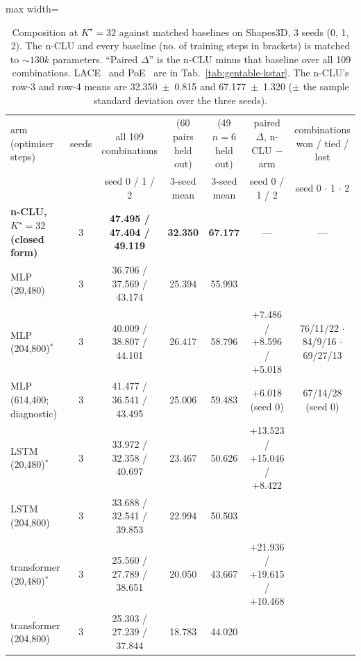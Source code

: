 \documentclass{article} %
\newcommand{\Kstar}{\ensuremath{K^{\star}}}
\begin{document}
\begin{table}[htb]
\centering\small
\caption{Composition at $\Kstar=32$ against matched baselines on Shapes3D, $3$
seeds (0, 1, 2). The n-CLU %
and every baseline (no. of training steps in brackets) is matched to $\sim130k$ parameters.  ``Paired $\Delta$'' is the n-CLU minus
that baseline over all 109 combinations. LACE~\citep{nie_controllable_2021} and PoE~\citep{hinton_training_2002} are in %
Tab.~\ref{tab:gentable-kstar}. The n-CLU's row-3 and row-4 means are 32.350~$\pm$~0.815 and 67.177~$\pm$~1.320 %
($\pm$ the sample standard deviation over the three seeds).}
\label{tab:t7}
\setlength{\tabcolsep}{3pt}
\begin{adjustbox}{max width=\linewidth}\begin{tabular}{lcccccc}
\toprule
arm (optimiser steps) & seeds & all 109 combinations & (60 pairs held out) & (49 $n=6$ held out) & paired $\Delta$, n-CLU $-$ arm & combinations won / tied / lost \\ %
 & & seed 0 / 1 / 2 & 3-seed mean & 3-seed mean & seed 0 / 1 / 2 & seed 0 $\cdot$ 1 $\cdot$ 2 \\
\midrule
\textbf{n-CLU, $\Kstar=32$ (closed form)} & 3 & \textbf{47.495 / 47.404 / 49.119} & \textbf{32.350} & \textbf{67.177} & --- & --- \\
MLP (20,480) & 3 & 36.706 / 37.569 / 43.174 & 25.394 & 55.993 & & \\
MLP (204,800)$^\ast$ & 3 & 40.009 / 38.807 / 44.101 & 26.417 & 58.796 & +7.486 / +8.596 / +5.018 & 76/11/22 $\cdot$ 84/9/16 $\cdot$ 69/27/13 \\
MLP (614,400; diagnostic) & 3 & 41.477 / 36.541 / 43.495 & 25.006 & 59.483 & +6.018 (seed 0) & 67/14/28 (seed 0) \\
LSTM (20,480)$^\ast$ & 3 & 33.972 / 32.358 / 40.697 & 23.467 & 50.626 & +13.523 / +15.046 / +8.422 & \\
LSTM (204,800) & 3 & 33.688 / 32.541 / 39.853 & 22.994 & 50.503 & & \\
transformer (20,480)$^\ast$ & 3 & 25.560 / 27.789 / 38.651 & 20.050 & 43.667 & +21.936 / +19.615 / +10.468 & \\
transformer (204,800) & 3 & 25.303 / 27.239 / 37.844 & 18.783 & 44.020 & & \\

\end{tabular}
\end{adjustbox}
\end{table}
\end{document}
